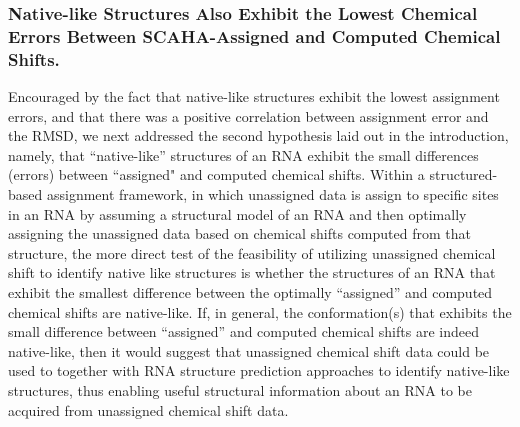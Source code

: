 \documentclass[journal=jcisd8,manuscript=article,layout=onecolumn]{achemso}
\begin{document}
{\subsubsection{Native-like Structures Also Exhibit the Lowest Chemical Errors Between SCAHA-Assigned and Computed Chemical Shifts.} Encouraged by the fact that native-like structures exhibit the lowest assignment errors, and that there was a positive correlation between assignment error and the RMSD, we next addressed the second hypothesis laid out in the introduction, namely, that “native-like” structures of an RNA exhibit the small differences (errors) between ``assigned" and computed chemical shifts. Within a structured-based assignment framework, in which unassigned data is assign to specific sites in an RNA by assuming a structural model of an RNA and then optimally assigning the unassigned data based on chemical shifts computed from that structure, the more direct test of the feasibility of utilizing unassigned chemical shift to identify native like structures is whether the structures of an RNA that exhibit the smallest difference between the optimally ``assigned'' and computed chemical shifts are native-like. If, in general, the conformation(s) that exhibits the small difference between ``assigned'' and computed chemical shifts are indeed native-like, then it would suggest that unassigned chemical shift data could be used to together with RNA structure prediction approaches to identify native-like structures, thus enabling useful structural information about an RNA to be acquired from unassigned chemical shift data.

}
\end{document}
